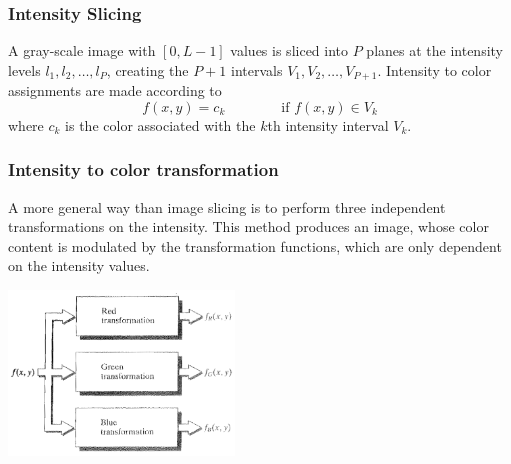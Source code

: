 \subsubsection{Intensity Slicing }
A gray-scale image with $[0,L-1]$ values is sliced into $P$ planes at the intensity levels $l_1,l_2,\dots,l_P$, creating the $P+1$ intervals $V_1,V_2,\dots,V_{P+1}$. Intensity to color assignments are made according to
\begin{equation}
	f(x,y) = c_k \qquad \qquad \text{if } f(x,y) \in V_k
\end{equation}
where $c_k$ is the color associated with the $k$th intensity interval $V_k$.

\subsubsection{Intensity to color transformation }
\begin{minipage}{12cm}
	A more general way than image slicing is to perform three independent transformations on the intensity. This method produces an image, whose color content is modulated by the transformation functions, which are only dependent on the intensity values.
\end{minipage}
\begin{minipage}{6cm}
	\includegraphics[width=6cm]{images/Pseudocolor_Processing.png}
\end{minipage}

